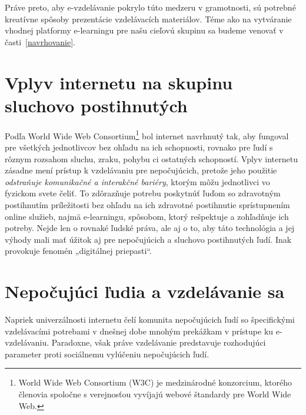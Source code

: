 \documentclass[10pt,oneside,slovak,a4paper]{article}
\begin{document}
Práve preto, aby e-vzdelávanie pokrylo túto medzeru v gramotnosti, sú potrebné kreatívne spôsoby prezentácie vzdelávacích materiálov. Téme ako na vytváranie vhodnej platformy e-learningu pre našu cieľovú skupinu sa budeme venovať v časti~\ref{navrhovanie}.


\section{Vplyv internetu na skupinu sluchovo postihnutých} \label{vplyv}

Podľa World Wide Web Consortium\footnote{World Wide Web Consortium (W3C) je medzinárodné konzorcium, ktorého členovia spoločne s verejnosťou vyvíjajú webové štandardy pre World Wide Web\cite{WWWC}.} bol internet navrhnutý tak, aby fungoval pre všetkých jednotlivcov bez ohľadu na ich schopnosti, rovnako pre ľudí  s rôznym rozsahom sluchu, zraku, pohybu ci ostatných  schopností. Vplyv internetu zásadne mení prístup k vzdelávaniu pre nepočujúcich, pretože jeho použitie \emph{odstraňuje komunikačné a interakčné bariéry}, ktorým môžu jednotlivci vo fyzickom svete čeliť. To zdôrazňuje potrebu poskytnúť ľuďom so zdravotným postihnutím príležitosti bez ohľadu na ich zdravotné postihnutie sprístupnením online služieb, najmä e-learningu, spôsobom, ktorý rešpektuje a zohľadňuje ich potreby. Nejde len o rovnaké ľudské práva, ale aj o to, aby táto technológia a jej výhody mali mať úžitok aj pre nepočujúcich a sluchovo postihnutých ľudí. Inak provokuje fenomén „digitálnej priepasti“\cite{pappas2018learning}.

\section{Nepočujúci ľudia a vzdelávanie sa} \label{vzdelanie}
Napriek univerzálnosti internetu čelí komunita nepočujúcich ľudí so špecifickými vzdelávacími potrebami v dnešnej dobe mnohým prekážkam v prístupe ku e-vzdelávaniu. Paradoxne,  však práve vzdelávanie predstavuje rozhodujúci parameter proti sociálnemu vylúčeniu nepočujúcich ľudí. 
\end{document}
